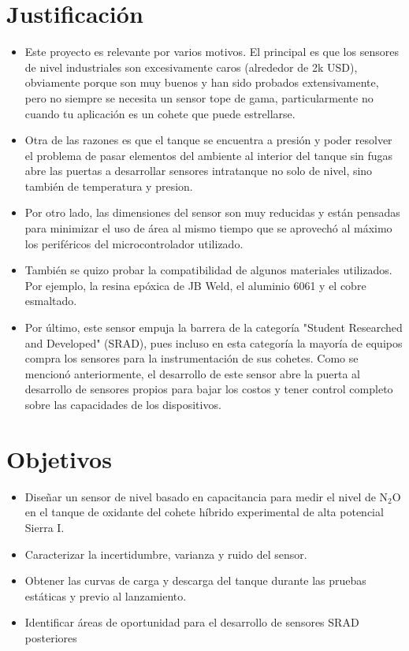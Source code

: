 \section{Justificación}
\begin{itemize}
\item Este proyecto es relevante por varios motivos. El principal es que los sensores de nivel industriales son excesivamente caros (alrededor de 2k USD), obviamente porque son muy buenos y han sido probados extensivamente, pero no siempre se necesita un sensor tope de gama, particularmente no cuando tu aplicación es un cohete que puede estrellarse.
\item Otra de las razones es que el tanque se encuentra a presión y poder resolver el problema de pasar elementos del ambiente al interior del tanque sin fugas abre las puertas a desarrollar sensores intratanque no solo de nivel, sino también de temperatura y presion.
\item Por otro lado, las dimensiones del sensor son muy reducidas y están pensadas para minimizar el uso de área al mismo tiempo que se aprovechó al máximo los periféricos del microcontrolador utilizado.
\item También se quizo probar la compatibilidad de algunos materiales utilizados. Por ejemplo, la resina epóxica de JB Weld, el aluminio 6061 y el cobre esmaltado.
\item Por último, este sensor empuja la barrera de la categoría "Student Researched and Developed" (SRAD), pues incluso en esta categoría la mayoría de equipos compra los sensores para la instrumentación de sus cohetes. Como se mencionó anteriormente, el desarrollo de este sensor abre la puerta al desarrollo de sensores propios para bajar los costos y tener control completo sobre las capacidades de los dispositivos.
\end{itemize}

\section{Objetivos}
\begin{itemize}
\item Diseñar un sensor de nivel basado en capacitancia para medir el nivel de N$_2$O en el tanque de oxidante del cohete híbrido experimental de alta potencial Sierra I.
\item Caracterizar la incertidumbre, varianza y ruido del sensor.
\item Obtener las curvas de carga y descarga del tanque durante las pruebas estáticas y previo al lanzamiento.
\item Identificar áreas de oportunidad para el desarrollo de sensores SRAD posteriores
\end{itemize}



